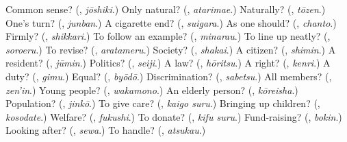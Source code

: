 \begin{tcolorbox}[breakable,colback=teal!4,colframe=teal!35!black,title={Before you move on}]
Common sense? (\textbf{}, \emph{jōshiki}.) Only natural? (\textbf{}, \emph{atarimae}.) Naturally? (\textbf{}, \emph{tōzen}.) One's turn? (\textbf{}, \emph{junban}.) A cigarette end? (\textbf{}, \emph{suigara}.) As one should? (\textbf{}, \emph{chanto}.) Firmly? (\textbf{}, \emph{shikkari}.) To follow an example? (\textbf{}, \emph{minarau}.) To line up neatly? (\textbf{}, \emph{soroeru}.) To revise? (\textbf{}, \emph{aratameru}.) Society? (\textbf{}, \emph{shakai}.) A citizen? (\textbf{}, \emph{shimin}.) A resident? (\textbf{}, \emph{jūmin}.) Politics? (\textbf{}, \emph{seiji}.) A law? (\textbf{}, \emph{hōritsu}.) A right? (\textbf{}, \emph{kenri}.) A duty? (\textbf{}, \emph{gimu}.) Equal? (\textbf{}, \emph{byōdō}.) Discrimination? (\textbf{}, \emph{sabetsu}.) All members? (\textbf{}, \emph{zen'in}.) Young people? (\textbf{}, \emph{wakamono}.) An elderly person? (\textbf{}, \emph{kōreisha}.) Population? (\textbf{}, \emph{jinkō}.) To give care? (\textbf{}, \emph{kaigo suru}.) Bringing up children? (\textbf{}, \emph{kosodate}.) Welfare? (\textbf{}, \emph{fukushi}.) To donate? (\textbf{}, \emph{kifu suru}.) Fund-raising? (\textbf{}, \emph{bokin}.) Looking after? (\textbf{}, \emph{sewa}.) To handle? (\textbf{}, \emph{atsukau}.)
\end{tcolorbox}
